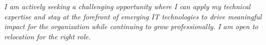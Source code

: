
\begin{center}
    \colorbox{backgroundgray}{
        \begin{minipage}{0.95\textwidth}
            \centering
            \vspace{6pt}
            \textit{\color{textgray}
            I am actively seeking a challenging opportunity where I can apply my technical expertise and stay at the forefront of emerging IT technologies to drive meaningful impact for the organization while continuing to grow professionally. I am open to relocation for the right role.
            }
            \vspace{6pt}
        \end{minipage}
    }
\end{center}
\vspace{6pt} 
